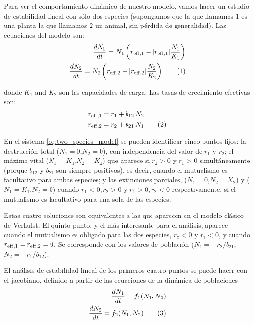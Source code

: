 Para ver el comportamiento dinámico de nuestro modelo, vamos hacer un estudio de estabilidad lineal con sólo dos especies (supongamos que la que llamamos $1$ es una planta la que llamamos $2$ un animal, sin pérdida de generalidad). Las ecuaciones del modelo son:
\begin{align*}
\displaystyle \frac{dN_1}{dt}= N_1 \left( r_{\rm{eff},1} - |r_{\rm{eff},1}| \frac{N_1}{K_1} \right) \\
\displaystyle \frac{dN_2}{dt}= N_2 \left( r_{\rm{eff},2} - |r_{\rm{eff},2}| \frac{N_2}{K_2} \right)
\stepcounter{equation}\tag{\theequation}\label{eq:two_species_model}
\end{align*}

\noindent donde $K_1$ and $K_2$ son las capacidades de carga. Las tasas de crecimiento efectivas son:
\begin{align*}
\displaystyle &r_{\rm{eff},1} = r_{1} + b_{12}\, N_2 \\
\displaystyle &r_{\rm{eff},2} = r_{2} + b_{21}\, N_1
\stepcounter{equation}\tag{\theequation}\label{eq:two_species_reff}
\end{align*}

En el sistema \ref{eq:two_species_model} se pueden identificar cinco puntos fijos:
la destrucción total ($N_1=0$,$N_2=0$), con independencia del valor de $r_{1}$ y $r_{2}$;
el máximo vital ($N_1=K_1$,$N_2=K_2$) que aparece si $r_{2}>0$ y $r_{1}>0$ simultáneamente (porque $b_{12}$ y $b_{21}$ son siempre positivos), es decir, cuando el mutualismo es facultativo para ambas especies; y las extinciones parciales, ($N_1=0$,$N_2=K_2$)
y ($N_1=K_1$,$N_2=0$) cuando $r_{1}<0,r_{2}>0$ y $r_{1}>0,r_{2}<0$ respectivamente, si el mutualismo es facultativo para una sola de las especies. 

Estas cuatro soluciones son equivalentes a las que aparecen en el modelo clásico de Verhulst. El quinto punto, y el más interesante para el análisis, aparece cuando el mutualismo es obligado para las dos especies, $r_{2}<0$ y $r_{1}<0$, y cuando $r_{\rm{eff},1}=r_{\rm{eff},2}=0$. Se corresponde con los valores de población ($N_1={-r_{2}}/{b_{21}}$, $N_2={-r_{1}}/{b_{12}}$).

El análisis de estabilidad lineal de los primeros cuatro puntos se puede hacer con el jacobiano, definido a partir de las ecuaciones de la dinámica de poblaciones
\begin{align*}
 \frac{dN_1}{dt} = f_1(N_1,N_2) \\
 \frac{dN_2}{dt} = f_2(N_1,N_2)
\stepcounter{equation}\tag{\theequation}\label{eq:Jacob00}
\end{align*}

